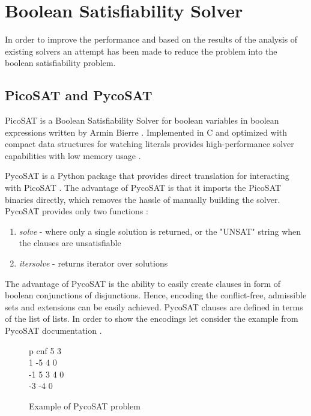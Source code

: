 \section{Boolean Satisfiability Solver} \label{section:satSolver}
In order to improve the performance and based on the results of the analysis of existing solvers an attempt has been made to reduce the problem into the boolean satisfiability problem. 

\subsection{PicoSAT and PycoSAT} \label{section:pycosat}
PicoSAT is a Boolean Satisfiability Solver for boolean variables in boolean expressions written by Armin Bierre \citep{picosatMan}. Implemented in C and optimized with compact data structures for watching literals provides high-performance solver capabilities with low memory usage \citep{picosat}.

PycoSAT is a Python package that provides direct translation for interacting with PicoSAT \citep{pycoSat}. The advantage of PycoSAT is that it imports the PicoSAT binaries directly, which removes the hassle of manually building the solver. PycoSAT provides only two functions \citep{pycosatPyPi}: 
\begin{enumerate}
	\item \textit{solve} - where only a single solution is returned, or the "UNSAT" string when the clauses are unsatisfiable
	\item \textit{itersolve} - returns iterator over solutions
\end{enumerate}

The advantage of PycoSAT is the ability to easily create clauses in form of boolean conjunctions of disjunctions. Hence, encoding the conflict-free, admissible sets and extensions can be easily achieved. PycoSAT clauses are defined in terms of the list of lists. In order to show the encodings let consider the example from PycoSAT documentation \citep{pycosatGithub}. 

\begin{figure}
\begin{tcolorbox}
	p cnf 5 3 \\
	1 -5 4 0 \\ 
	-1 5 3 4 0 \\
	-3 -4 0 
\end{tcolorbox}
\caption{Example of PycoSAT problem}
\label{fig:pycosat1}
\end{figure}

